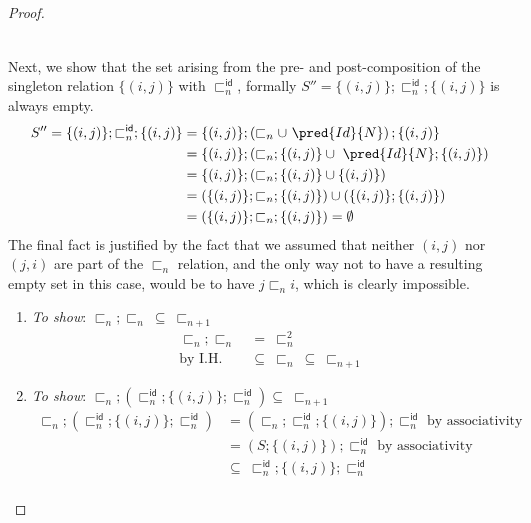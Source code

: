 \begin{lem}
{\begin{proof}
\[\begin{array}{l @{\hspace{50pt}} l}
\begin{aligned}
				\end{aligned}
		\end{array}
	\]
	Next, we show that the set arising from the pre- and post-composition of the singleton relation $\{(i,j)\}$ with $\sqsubset_n^\mathsf{id}$, formally $S'' = \{ (i, j) \} ; \sqsubset_n^\mathsf{id} ; \{ (i, j) \}$ is always empty.
	\begin{align*}
		S'' = 
		\{ (i, j) \} ; \sqsubset_n^\mathsf{id} ; \{ (i, j) \}
			&=
		\{ (i, j) \} ; \left( \sqsubset_n \cup\ \pred{Id}{N} \right) ; \{ (i, j) \} \\
			&=
		\{ (i, j) \} ; \left( \sqsubset_n  ; \{ (i, j) \} \cup\ \pred{Id}{N}  ; \{ (i, j) \} \right) \\
			&=
		\{ (i, j) \} ; \left( \sqsubset_n ; \{ (i, j) \} \cup \{ (i, j) \} \right) \\
			&=
		\left( \{ (i, j) \} ; \sqsubset_n ; \{ (i, j) \} \right) \cup \left(\{ (i, j) \} ; \{ (i, j) \} \right) \\
		 	&=
		 \left( \{ (i, j) \} ; \sqsubset_n ; \{ (i, j) \} \right) = \emptyset
	\end{align*}
	The final fact is justified by the fact that we assumed that neither $(i, j)$ nor $(j, i)$ are part of the $\sqsubset_n$ relation, and the only way not to have a resulting empty set in this case, would be to have $j \sqsubset_n i$, which is clearly impossible.
	\begin{enumerate}[label=\alph*)]
		\item \textit{To show}: $\sqsubset_n ; \sqsubset_n\ \subseteq\ \sqsubset_{n + 1}$
			\begin{align*}
				\sqsubset_n ; \sqsubset_n\ &=\ \sqsubset_n^2 \\
				\text{by I.H.}&\subseteq\ \sqsubset_n\ \subseteq\ \sqsubset_{n + 1}
			\end{align*}
		\item \textit{To show}: $\sqsubset_n ; \left( \sqsubset_n^\mathsf{id} ; \{ (i, j) \} ; \sqsubset_n^\mathsf{id} \right) \subseteq\ \sqsubset_{n + 1}$
			\begin{align*}
				\sqsubset_n ; \left( \sqsubset_n^\mathsf{id} ; \{ (i, j) \} ; \sqsubset_n^\mathsf{id} \right) &= \left( \sqsubset_n ; \sqsubset_n^\mathsf{id} ; \{ (i, j) \} \right) ; \sqsubset_n^\mathsf{id} \text{ by associativity} \\
				&= \left( S ; \{ (i, j) \} \right) ; \sqsubset_n^\mathsf{id} \text{ by associativity} \\
				&\subseteq\ \sqsubset_n^\mathsf{id} ; \{ (i, j) \} ; \sqsubset_n^\mathsf{id} \\

\end{align*}
\end{enumerate}
\end{proof}}
\end{lem}

